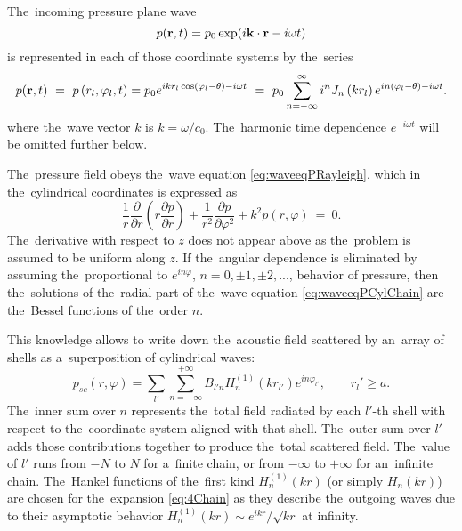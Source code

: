 The~incoming pressure plane wave
\begin{equation}
p({{\bf r},t}) = p_0 \exp(i {\bf k \cdot r}-i \omega t)
\end{equation}
is represented in each of those coordinate systems by the~series
\begin{equation}
\label{eq:3Chain}
p({{\bf r},t})~=~{p}\left(r_l,\varphi_{l},t \right) = p_0 e^{i k r_l\cos\left(\varphi_l-\theta\right)-i \omega t}
~=~p_0\sum\limits_{n=-\infty}^{\infty}i^{n} J_{n}\left(k r_l\right) e^{i n\left(\varphi_l-\theta\right) -i \omega t}.
\end{equation}
where the~wave vector $k$ is $k=\omega/c_0$.
The~harmonic time dependence $e^{-i \omega t}$ will be omitted further below.

The~pressure field obeys the~wave equation \cref{eq:waveeqPRayleigh}, which in the~cylindrical coordinates is expressed as
\begin{equation}
\label{eq:waveeqPCylChain}
\frac{1}{r}\frac{\partial}{\partial r}\left(r\frac{\partial p}{\partial r}\right) + \frac{1}{r^2}\frac{\partial p}{\partial \varphi^2} + k^2 p(r,\varphi)~=~0.
\end{equation}
The~derivative with respect to $z$ does not appear above as the~problem is assumed to be uniform along $z$.
If the~angular dependence is eliminated by assuming the~proportional to $e^{in\varphi}$, $n=0,\pm1,\pm2,...$, behavior of pressure, then the~solutions of the~radial part of the~wave equation \cref{eq:waveeqPCylChain} are the~Bessel functions of the~order $n$.

This knowledge allows to write down the~acoustic field scattered by an~array of shells as a~superposition of cylindrical waves:
\begin{equation}
\label{eq:4Chain}
p_{sc}(r,\varphi) = \sum\limits_{l'} \sum\limits_{n=-\infty}^{+\infty} B_{l'n} H_{n}^{(1)}\left(k r_{l'}\right) e^{i n \varphi_{l'}}, \qquad r_l' \geq a.
\end{equation}
The~inner sum over $n$ represents the~total field radiated by each $l'$-th shell with respect to the~coordinate system aligned with that shell.
The~outer sum over $l'$ adds those contributions together to produce the~total scattered field.
The~value of $l'$ runs from $-N$ to $N$ for a~finite chain, or from $-\infty$ to $+\infty$ for an~infinite chain.
The~Hankel functions of the~first kind $H_n^{(1)}(kr)$ (or simply $H_n(kr)$) are chosen for the~expansion \cref{eq:4Chain} as they describe the~outgoing waves due to their asymptotic behavior $H_n^{(1)}(kr) \sim e^{ikr}/\sqrt{kr}$ at infinity.


